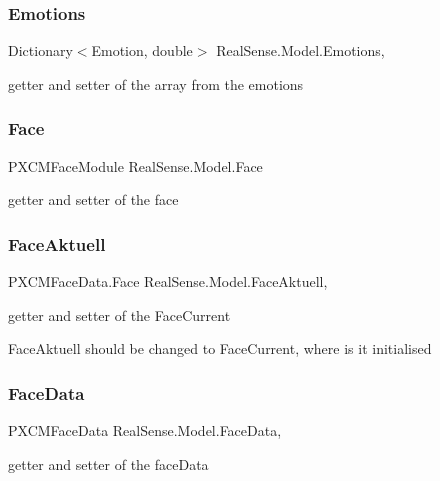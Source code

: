 \subsubsection{Emotions}
{\footnotesize\ttfamily Dictionary$<$Emotion, double$>$ Real\+Sense.\+Model.\+Emotions\hspace{0.3cm}{\ttfamily [get]}, {\ttfamily [set]}}

getter and setter of the array from the emotions \mbox{\label{class_real_sense_1_1_model_abb8701f1030ca1e3bfd226a9ad352da5}} 
\subsubsection{Face}
{\footnotesize\ttfamily P\+X\+C\+M\+Face\+Module Real\+Sense.\+Model.\+Face\hspace{0.3cm}{\ttfamily [get]}}

getter and setter of the face \mbox{\label{class_real_sense_1_1_model_a3621c14d22c3709775971fed725c2781}} 
\subsubsection{Face\+Aktuell}
{\footnotesize\ttfamily P\+X\+C\+M\+Face\+Data.\+Face Real\+Sense.\+Model.\+Face\+Aktuell\hspace{0.3cm}{\ttfamily [get]}, {\ttfamily [set]}}

getter and setter of the Face\+Current

Face\+Aktuell should be changed to Face\+Current, where is it initialised \mbox{\label{class_real_sense_1_1_model_a0d16c2536a9f3c346cc3d51b3227989e}} 
\subsubsection{Face\+Data}
{\footnotesize\ttfamily P\+X\+C\+M\+Face\+Data Real\+Sense.\+Model.\+Face\+Data\hspace{0.3cm}{\ttfamily [get]}, {\ttfamily [set]}}

getter and setter of the face\+Data \mbox{\label{class_real_sense_1_1_model_abf6324c9f4acc3134909a239eff37a0a}} 
